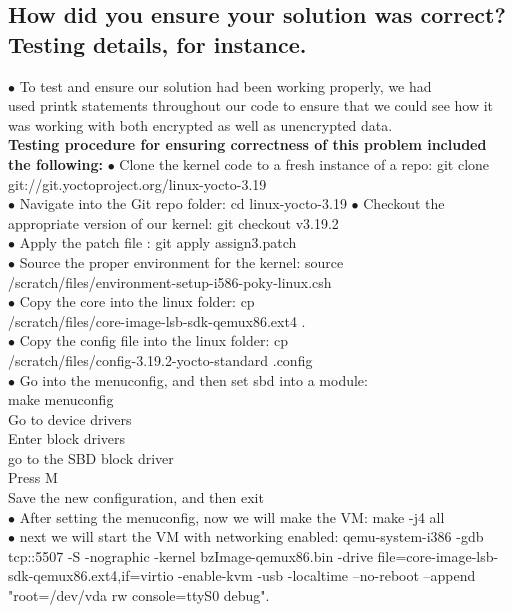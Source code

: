 \documentclass[letterpaper,10pt,fleqn,draftclsnofoot,onecolumn]{IEEEtran}
\begin{document}
	\subsection{How did you ensure your solution was correct? Testing details, for instance.}
	$\bullet$ To test and ensure our solution had been working properly, we had\\ used printk statements throughout our code to ensure that we could see how it was working with both encrypted as well as unencrypted data.\\
	\textbf{Testing procedure for ensuring correctness of this problem included the following:}\newline
	$\bullet$ Clone the kernel code to a fresh instance of a repo: git clone git://git.yoctoproject.org/linux-yocto-3.19\\
	$\bullet$ Navigate into the Git repo folder: cd linux-yocto-3.19
	$\bullet$ Checkout the appropriate version of our kernel: git checkout v3.19.2\\
	$\bullet$ Apply the patch file : git apply assign3.patch\\
	$\bullet$ Source the proper environment for the kernel: source\\ /scratch/files/environment-setup-i586-poky-linux.csh\\
	$\bullet$ Copy the core into the linux folder: cp\\ /scratch/files/core-image-lsb-sdk-qemux86.ext4 .\\
	$\bullet$ Copy the config file into the linux folder: cp\\ /scratch/files/config-3.19.2-yocto-standard .config\\
	$\bullet$ Go into the menuconfig, and then set sbd into a module:\\
	make menuconfig\\
	Go to device drivers\\
	Enter block drivers\\
	go to the SBD block driver\\
	Press M\\
	Save the new configuration, and then exit\\
	$\bullet$ After setting the menuconfig, now we will make the VM: make -j4 all\\
	$\bullet$ next we will start the VM with networking enabled: qemu-system-i386 -gdb tcp::5507 -S -nographic -kernel bzImage-qemux86.bin -drive file=core-image-lsb-sdk-qemux86.ext4,if=virtio -enable-kvm -usb -localtime --no-reboot --append "root=/dev/vda rw console=ttyS0 debug".\\
\end{document}
